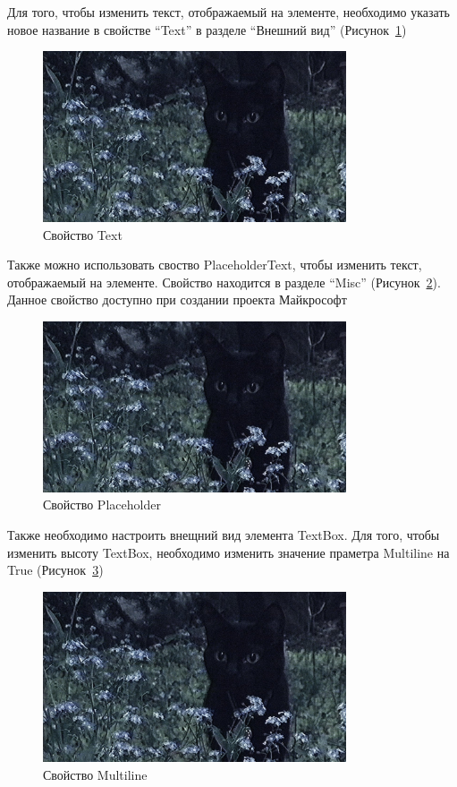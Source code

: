 \documentclass[12pt]{article}
\renewcommand{\texttt}[1]{{\small\ttfamily #1}}
\numberwithin{listing}{section}
\numberwithin{figure}{section}
\begin{document}
Для того, чтобы изменить текст, отображаемый на элементе, необходимо указать новое название в свойстве “\texttt{Text}” в разделе “Внешний вид” (Рисунок~\ref{fig:Свойство text})

\begin{figure}[H]
	\centering
	\includegraphics[width=0.8\textwidth]{fig/none.png}
	\caption{Свойство Text}
	\label{fig:Свойство text}
\end{figure}

Также можно использовать своство \texttt{PlaceholderText}, чтобы изменить текст, отображаемый на элементе. Свойство находится в разделе “Misc” (Рисунок~\ref{fig:Свойство Placeholder}). Данное свойство доступно при создании проекта Майкрософт

\begin{figure}[H]
	\centering
	\includegraphics[width=0.8\textwidth]{fig/none.png}
	\caption{Свойство \texttt{Placeholder}}
	\label{fig:Свойство Placeholder}
\end{figure}

Также необходимо настроить внещний вид элемента TextBox. Для того, чтобы изменить высоту TextBox, необходимо изменить значение праметра \texttt{Multiline} на True (Рисунок~\ref{fig:Свойство Multiline})


\begin{figure}[H]
	\centering
	\includegraphics[width=0.8\textwidth]{fig/none.png}
	\caption{Свойство \texttt{Multiline}}
	\label{fig:Свойство Multiline}
\end{figure}
\end{document}
